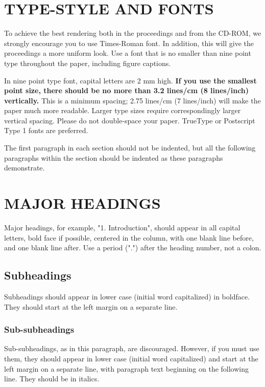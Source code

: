 \documentclass{article}
\begin{document}
\section{TYPE-STYLE AND FONTS}
\label{sec:typestyle}

To achieve the best rendering both in the proceedings and from the CD-ROM, we
strongly encourage you to use Times-Roman font.  In addition, this will give
the proceedings a more uniform look.  Use a font that is no smaller than nine
point type throughout the paper, including figure captions.

In nine point type font, capital letters are 2 mm high.  {\bf If you use the
smallest point size, there should be no more than 3.2 lines/cm (8 lines/inch)
vertically.}  This is a minimum spacing; 2.75 lines/cm (7 lines/inch) will make
the paper much more readable.  Larger type sizes require correspondingly larger
vertical spacing.  Please do not double-space your paper.  TrueType or
Postscript Type 1 fonts are preferred.

The first paragraph in each section should not be indented, but all the
following paragraphs within the section should be indented as these paragraphs
demonstrate.

\section{MAJOR HEADINGS}
\label{sec:majhead}

Major headings, for example, "1. Introduction", should appear in all capital
letters, bold face if possible, centered in the column, with one blank line
before, and one blank line after. Use a period (".") after the heading number,
not a colon.

\subsection{Subheadings}
\label{ssec:subhead}

Subheadings should appear in lower case (initial word capitalized) in
boldface.  They should start at the left margin on a separate line.
 
\subsubsection{Sub-subheadings}
\label{sssec:subsubhead}

Sub-subheadings, as in this paragraph, are discouraged. However, if you
must use them, they should appear in lower case (initial word
capitalized) and start at the left margin on a separate line, with paragraph
text beginning on the following line.  They should be in italics.
\end{document}
